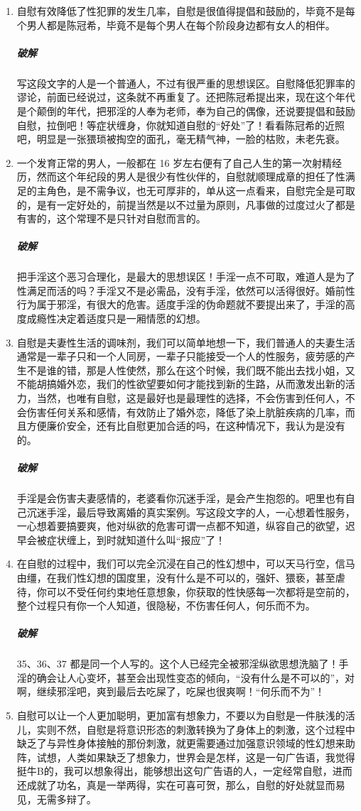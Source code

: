 \documentclass{ctexart}
\begin{document}
\begin{enumerate}
    \item 自慰有效降低了性犯罪的发生几率，自慰是很值得提倡和鼓励的，毕竟不是每个男人都是陈冠希，毕竟不是每个男人在每个阶段身边都有女人的相伴。
    \subparagraph{破解} 写这段文字的人是一个普通人，不过有很严重的思想误区。自慰降低犯罪率的谬论，前面已经说过，这条就不再重复了。还把陈冠希提出来，现在这个年代是个颠倒的年代，把邪淫的人奉为老师，奉为自己的偶像，还说要提倡和鼓励自慰，拉倒吧！等症状缠身，你就知道自慰的“好处”了！看看陈冠希的近照吧，明显是一张猥琐被掏空的面孔，毫无精气神，一脸的枯败，未老先衰。
    \item 一个发育正常的男人，一般都在 16 岁左右便有了自己人生的第一次射精经历，然而这个年纪段的男人是很少有性伙伴的，自慰就顺理成章的担任了性满足的主角色，是不需争议，也无可厚非的，单从这一点看来，自慰完全是可取的，是有一定好处的，前提当然是以不过量为原则，凡事做的过度过火了都是有害的，这个常理不是只针对自慰而言的。
    \subparagraph{破解} 把手淫这个恶习合理化，是最大的思想误区！手淫一点不可取，难道人是为了性满足而活的吗？手淫又不是必需品，没有手淫，依然可以活得很好。婚前性行为属于邪淫，有很大的危害。适度手淫的伪命题就不要提出来了，手淫的高度成瘾性决定着适度只是一厢情愿的幻想。
    \item 自慰是夫妻性生活的调味剂，我们可以简单地想一下，我们普通人的夫妻生活通常是一辈子只和一个人同房，一辈子只能接受一个人的性服务，疲劳感的产生不是谁的错，那是人性使然，那么在这个时候，我们既不能出去找小姐，又不能胡搞婚外恋，我们的性欲望要如何才能找到新的生路，从而激发出新的活力，当然，也唯有自慰，这是最好也是最理性的选择，不会伤害到任何人，不会伤害任何关系和感情，有效防止了婚外恋，降低了染上肮脏疾病的几率，而且方便廉价安全，还有比自慰更加合适的吗，在这种情况下，我认为是没有的。
    \subparagraph{破解} 手淫是会伤害夫妻感情的，老婆看你沉迷手淫，是会产生抱怨的。吧里也有自己沉迷手淫，最后导致离婚的真实案例。写这段文字的人，一心想着性服务，一心想着要搞要爽，他对纵欲的危害可谓一点都不知道，纵容自己的欲望，迟早会被症状缠上，到时就知道什么叫“报应”了！
    \item 在自慰的过程中，我们可以完全沉浸在自己的性幻想中，可以天马行空，信马由缰，在我们性幻想的国度里，没有什么是不可以的，强奸、猥亵，甚至虐待，你可以不受任何约束地任意想象，你获取的性快感每一次都将是空前的，整个过程只有你一个人知道，很隐秘，不伤害任何人，何乐而不为。
    \subparagraph{破解} 35、36、37 都是同一个人写的。这个人已经完全被邪淫纵欲思想洗脑了！手淫的确会让人心变坏，甚至会出现性变态的倾向，“没有什么是不可以的”，对啊，继续邪淫吧，爽到最后去吃屎了，吃屎也很爽啊！“何乐而不为”！
    \item 自慰可以让一个人更加聪明，更加富有想象力，不要以为自慰是一件肤浅的活儿，实则不然，自慰是将意识形态的刺激转换为了身体上的刺激，这个过程中缺乏了与异性身体接触的那份刺激，就更需要通过加强意识领域的性幻想来助阵，试想，人类如果缺乏了想象力，世界会是怎样，这是一句广告语，我觉得挺牛B的，我可以想象得出，能够想出这句广告语的人，一定经常自慰，进而还成就了功名，真是一举两得，实在可喜可贺，那么，自慰的好处就显而易见，无需多辩了。

\end{enumerate}
\end{document}
